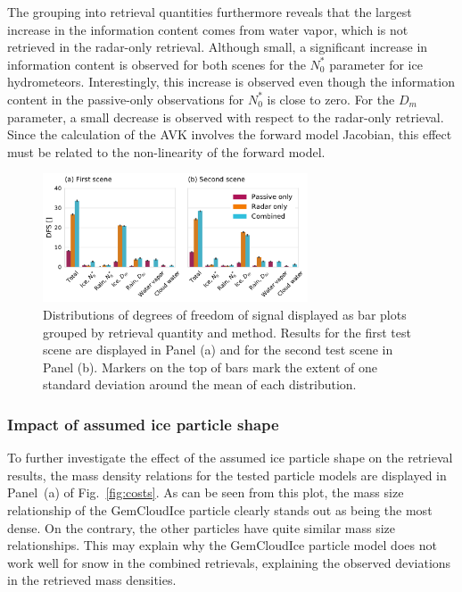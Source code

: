 \documentclass[journal abbreviation, manuscript]{copernicus}
\begin{document}
The grouping into retrieval quantities furthermore reveals that the largest
increase in the information content comes from water vapor, which is not
retrieved in the radar-only retrieval. Although small, a significant increase in
information content is observed for both scenes for the $N_0^*$ parameter for
ice hydrometeors. Interestingly, this increase is observed even though the
information content in the passive-only observations for $N_0^*$ is close to
zero. For the $D_m$ parameter, a small decrease is observed with respect
to the radar-only retrieval. Since the calculation of the AVK involves the
forward model Jacobian, this effect must be related to the non-linearity
of the forward model.

\begin{figure}
\centering
\includegraphics[width = 0.7\textwidth]{../plots/dofs}
\caption{Distributions of degrees of freedom of signal displayed as bar plots
  grouped by retrieval quantity and method. Results for the first test scene are
  displayed in Panel (a) and for the second test scene in Panel (b). Markers on
  the top of bars mark the extent of one standard deviation around the mean of
  each distribution.}
\label{fig:dofs}
\end{figure}

\subsubsection{Impact of assumed ice particle shape}



To further investigate the effect of the assumed ice particle shape on the
retrieval results, the mass density relations for the tested particle models are
displayed in Panel~(a) of Fig.~\ref{fig:costs}. As can be seen from this plot,
the mass size relationship of the GemCloudIce particle clearly stands out as
being the most dense. On the contrary, the other particles have quite similar
mass size relationships. This may explain why the GemCloudIce particle model
does not work well for snow in the combined retrievals, explaining the observed
deviations in the retrieved mass densities.
\end{document}
